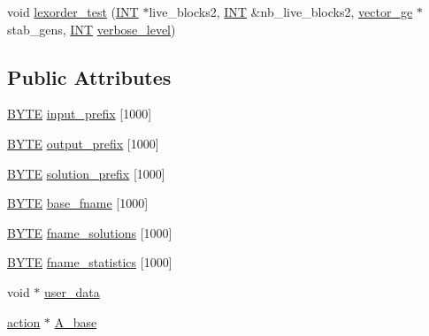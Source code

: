 \begin{DoxyCompactItemize}
\item 
void \mbox{\hyperlink{classexact__cover_a5f11e25f122a6eecf845c5b6d5680de8}{lexorder\+\_\+test}} (\mbox{\hyperlink{galois_8h_a09fddde158a3a20bd2dcadb609de11dc}{I\+NT}} $\ast$live\+\_\+blocks2, \mbox{\hyperlink{galois_8h_a09fddde158a3a20bd2dcadb609de11dc}{I\+NT}} \&nb\+\_\+live\+\_\+blocks2, \mbox{\hyperlink{classvector__ge}{vector\+\_\+ge}} $\ast$stab\+\_\+gens, \mbox{\hyperlink{galois_8h_a09fddde158a3a20bd2dcadb609de11dc}{I\+NT}} \mbox{\hyperlink{simeon_8_c_a818073fbcc2f439e7c56952f67386122}{verbose\+\_\+level}})
\end{DoxyCompactItemize}
\subsection*{Public Attributes}
\begin{DoxyCompactItemize}
\item 
\mbox{\hyperlink{galois_8h_ab6cc7b4aeb6ea31aba2b3fbfc83ff5e6}{B\+Y\+TE}} \mbox{\hyperlink{classexact__cover_a6b8795af812c7d8a13567dd533e7692e}{input\+\_\+prefix}} \mbox{[}1000\mbox{]}
\item 
\mbox{\hyperlink{galois_8h_ab6cc7b4aeb6ea31aba2b3fbfc83ff5e6}{B\+Y\+TE}} \mbox{\hyperlink{classexact__cover_a798cf43561b3cfb9502a0be28f45b084}{output\+\_\+prefix}} \mbox{[}1000\mbox{]}
\item 
\mbox{\hyperlink{galois_8h_ab6cc7b4aeb6ea31aba2b3fbfc83ff5e6}{B\+Y\+TE}} \mbox{\hyperlink{classexact__cover_a1d64be8afc172a2c2b88084c9acb873d}{solution\+\_\+prefix}} \mbox{[}1000\mbox{]}
\item 
\mbox{\hyperlink{galois_8h_ab6cc7b4aeb6ea31aba2b3fbfc83ff5e6}{B\+Y\+TE}} \mbox{\hyperlink{classexact__cover_ac567172bdce6ae702e4a08f01e2c723e}{base\+\_\+fname}} \mbox{[}1000\mbox{]}
\item 
\mbox{\hyperlink{galois_8h_ab6cc7b4aeb6ea31aba2b3fbfc83ff5e6}{B\+Y\+TE}} \mbox{\hyperlink{classexact__cover_a21b44e490fbd23d0bf96c88e1586146b}{fname\+\_\+solutions}} \mbox{[}1000\mbox{]}
\item 
\mbox{\hyperlink{galois_8h_ab6cc7b4aeb6ea31aba2b3fbfc83ff5e6}{B\+Y\+TE}} \mbox{\hyperlink{classexact__cover_a9c52583e6c84a336b70dbb36d90ca41a}{fname\+\_\+statistics}} \mbox{[}1000\mbox{]}
\item 
void $\ast$ \mbox{\hyperlink{classexact__cover_ac1543bac5197f35715ff30402385ae4b}{user\+\_\+data}}
\item 
\mbox{\hyperlink{classaction}{action}} $\ast$ \mbox{\hyperlink{classexact__cover_aed89508b38628ac50b3dde7dfede3ff9}{A\+\_\+base}}

\end{DoxyCompactItemize}

